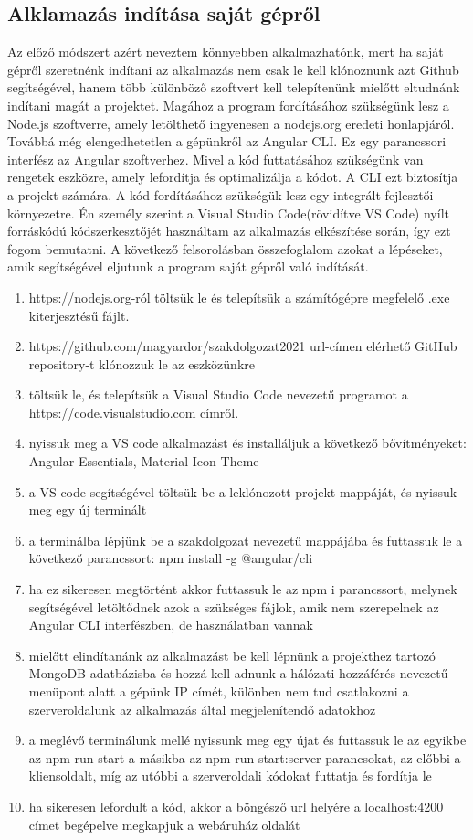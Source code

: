 \subsection{Alklamazás indítása saját gépről}
Az előző  módszert azért neveztem könnyebben alkalmazhatónk, mert ha saját gépről szeretnénk indítani az alkalmazás nem csak le kell klónoznunk azt Github segítségével, hanem több különböző szoftvert kell telepítenünk mielőtt eltudnánk indítani magát a projektet. Magához a program fordításához szükségünk lesz a Node.js szoftverre, amely letölthető ingyenesen a nodejs.org eredeti honlapjáról. Továbbá még elengedhetetlen a gépünkről az Angular CLI. Ez egy parancssori interfész az Angular szoftverhez. Mivel a kód futtatásához szükségünk van rengetek eszközre, amely lefordítja és optimalizálja a kódot. A CLI ezt biztosítja a projekt számára. A kód fordításához szükségük lesz egy integrált fejlesztői környezetre. Én személy szerint a Visual Studio Code(rövidítve VS Code) nyílt forráskódú kódszerkesztőjét használtam az alkalmazás elkészítése során, így ezt fogom bemutatni. A következő felsorolásban összefoglalom azokat a lépéseket, amik segítségével eljutunk a program saját gépről való indítását. 

\begin{enumerate}
	\item\label{step:first} https://nodejs.org-ról töltsük le és telepítsük a számítógépre megfelelő .exe kiterjesztésű fájlt.
	\item https://github.com/magyardor/szakdolgozat2021 url-címen elérhető GitHub repository-t klónozzuk le az eszközünkre
	\item töltsük le, és telepítsük a Visual Studio Code nevezetű programot a https://code.visualstudio.com címről.
	\item nyissuk meg a VS code alkalmazást és installáljuk a következő bővítményeket: Angular Essentials, Material Icon Theme
	\item a VS code segítségével töltsük be a leklónozott projekt mappáját, és nyissuk meg egy új terminált
	\item a terminálba lépjünk be a szakdolgozat nevezetű mappájába és futtassuk le a következő parancssort: npm install -g @angular/cli
	\item ha ez sikeresen megtörtént akkor futtassuk le az npm i parancssort, melynek segítségével letöltődnek azok a szükséges fájlok, amik nem szerepelnek az Angular CLI interfészben, de használatban vannak 
	\item mielőtt elindítanánk az alkalmazást be kell lépnünk a projekthez tartozó MongoDB adatbázisba és hozzá kell adnunk a hálózati hozzáférés nevezetű menüpont alatt a gépünk IP címét, különben nem tud csatlakozni a szerveroldalunk az alkalmazás által megjelenítendő adatokhoz
	\item a meglévő terminálunk mellé nyissunk meg egy újat és futtassuk le az egyikbe az npm run start a másikba az npm run start:server parancsokat, az előbbi a kliensoldalt, míg az utóbbi a szerveroldali kódokat futtatja és fordítja le
	\item ha sikeresen lefordult a kód, akkor a böngésző url helyére a localhost:4200 címet begépelve megkapjuk a webáruház oldalát
\end{enumerate}


